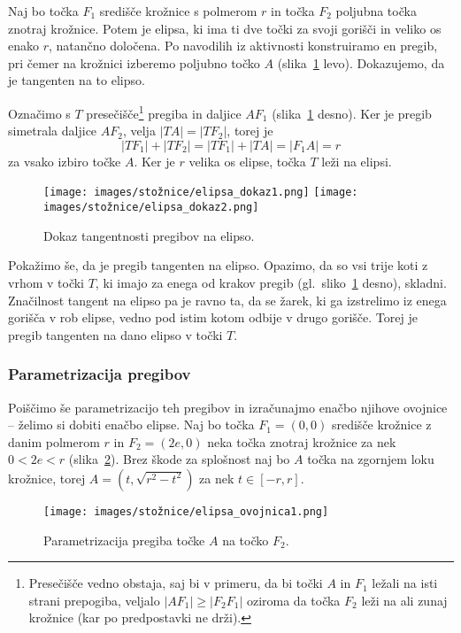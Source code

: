 \begin{dokaz}
    Naj bo točka $F_1$ središče krožnice s polmerom $r$ in točka $F_2$ poljubna točka znotraj krožnice. Potem je elipsa, ki ima ti dve točki za svoji gorišči in veliko os enako $r$, natančno določena. Po navodilih iz aktivnosti konstruiramo en pregib, pri čemer na krožnici izberemo poljubno točko $A$ (slika~\ref{fig:dokaz_elipsa} levo). Dokazujemo, da je tangenten na to elipso.

    Označimo s $T$ presečišče\footnote{Presečišče vedno obstaja, saj bi v primeru, da bi točki $A$ in $F_1$ ležali na isti strani prepogiba, veljalo $|AF_1| \geq |F_2F_1|$ oziroma da točka $F_2$ leži na ali zunaj krožnice (kar po predpostavki ne drži).} pregiba in daljice $AF_1$ (slika~\ref{fig:dokaz_elipsa} desno). Ker je pregib simetrala daljice $AF_2$, velja $|TA| = |TF_2|$, torej je
    $$|TF_1| + |TF_2| = |TF_1| + |TA| = |F_1A| = r$$
    za vsako izbiro točke $A$. Ker je $r$ velika os elipse, točka $T$ leži na elipsi.
    \begin{figure}[h]
        \centering
        \texttt{[image: images/stožnice/elipsa\_dokaz1.png]}
        \texttt{[image: images/stožnice/elipsa\_dokaz2.png]}
        \caption[Tangentnost na elipso]{Dokaz tangentnosti pregibov na elipso.}
        \label{fig:dokaz_elipsa}
    \end{figure}
    
    Pokažimo še, da je pregib tangenten na elipso. Opazimo, da so vsi trije koti z vrhom v točki $T$, ki imajo za enega od krakov pregib (gl.\ sliko~\ref{fig:dokaz_elipsa} desno), skladni. Značilnost tangent na elipso pa je ravno ta, da se žarek, ki ga izstrelimo iz enega gorišča v rob elipse, vedno pod istim kotom odbije v drugo gorišče. Torej je pregib tangenten na dano elipso v točki $T$.
\end{dokaz}

\subsubsection*{Parametrizacija pregibov}

Poiščimo še parametrizacijo teh pregibov in izračunajmo enačbo njihove ovojnice -- želimo si dobiti enačbo elipse. Naj bo točka $F_1 = (0,0)$ središče krožnice z danim polmerom $r$ in $F_2 = (2e,0)$ neka točka znotraj krožnice za nek $0 < 2e < r$ (slika~\ref{fig:enacba_elipse}). Brez škode za splošnost naj bo $A$ točka na zgornjem loku krožnice, torej $A = (t, \sqrt{r^2-t^2})$ za nek $t \in [-r, r]$.
\begin{figure}[h]
    \centering
    \texttt{[image: images/stožnice/elipsa\_ovojnica1.png]}
    \caption[Enačba tangente na elipso]{Parametrizacija pregiba točke $A$ na točko $F_2$.}
    \label{fig:enacba_elipse}
\end{figure}

